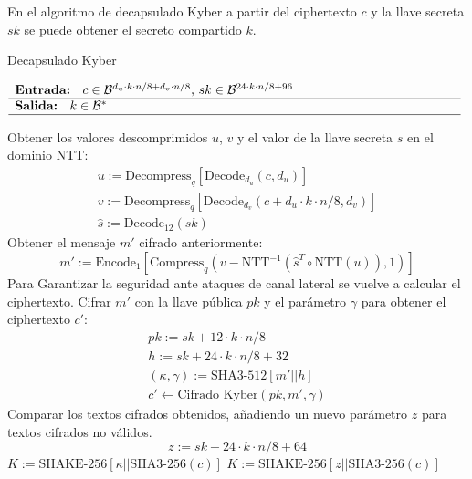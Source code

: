 En el algoritmo de decapsulado Kyber a partir del ciphertexto \(c\)  y la llave secreta \(sk\) se puede obtener el secreto compartido \(k\).
\begin{algorithm}[H]
	\small
	\caption{Decapsulado Kyber}
	$\begin{array}{p{\textwidth}}
		\textbf{Entrada: } \(c\in \mathcal{B}^{d_u\cdot k\cdot n/8+d_v\cdot n/8}\), \(sk\in \mathcal{B}^{24\cdot k\cdot n/8+96}\)\\ 
		\hline
		\textbf{Salida: } \(k\in \mathcal{B}^{*}\)\\ 
		\hline
	\end{array}$
	\begin{algorithmic}[1]
		\State Obtener los valores descomprimidos \(u\), \(v\) y el valor de la llave secreta \(s\) en el dominio NTT:
		\begin{equation}
			\begin{array}{l}
				u:=\text{Decompress}_q[\text{Decode}_{d_u}(c,d_u)]\\
				v:=\text{Decompress}_q[\text{Decode}_{d_v}(c+d_u\cdot k\cdot n/8,d_v)]\\
				\hat{s}:=\text{Decode}_{12}(sk)
			\end{array}
		\end{equation}
		\State Obtener el mensaje \(m'\) cifrado anteriormente:
		\begin{equation}
			m':=\text{Encode}_1[\text{Compress}_q\left(v-\text{NTT}^{-1}(\hat{s}^T\circ \text{NTT}(u)),1\right)]
		\end{equation}
		\Statex Para Garantizar la seguridad ante ataques de canal lateral se vuelve a calcular el ciphertexto.
		\State Cifrar \(m'\) con la llave pública \(pk\) y el parámetro \(\gamma\) para obtener el ciphertexto \(c'\):
		\begin{equation}
			\begin{array}{l}
				pk:=sk+12\cdot k\cdot n/8\\
				h:=sk+24\cdot k\cdot n/8+32\\
				(\kappa, \gamma):=\text{SHA3-512}[m'||h]\\
				c'\gets \text{Cifrado Kyber}(pk,m',\gamma)
			\end{array}
		\end{equation}
		\State Comparar los textos cifrados obtenidos, añadiendo un nuevo parámetro \(z\) para textos cifrados no válidos.
		\begin{equation}
			z:=sk+24\cdot k \cdot n/8 +64
		\end{equation}
		\State \Return \(K:=\text{SHAKE-256}[\kappa||\text{SHA3-256}(c)]\) 
		\Else
		\State \Return \(K:=\text{SHAKE-256}[z||\text{SHA3-256}(c)]\) 
		\EndIf
	\end{algorithmic}
\end{algorithm}


